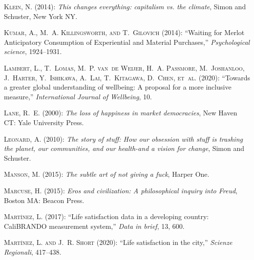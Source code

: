 \documentclass[10pt, letterpaper]{article}
\begin{document}
\begin{spacing}{2}
\begin{thebibliography}{120}
\textsc{Klein, N.} (2014): \emph{This changes everything: capitalism vs. the
  climate}, Simon and Schuster, New York NY.

\textsc{Kumar, A., M.~A. Killingsworth, and T.~Gilovich} (2014):
  \enquote{Waiting for Merlot Anticipatory Consumption of Experiential and
  Material Purchases,} \emph{Psychological science}, 1924--1931.

\textsc{Lambert, L., T.~Lomas, M.~P. van~de Weijer, H.~A. Passmore,
  M.~Joshanloo, J.~Harter, Y.~Ishikawa, A.~Lai, T.~Kitagawa, D.~Chen, et~al.}
  (2020): \enquote{Towards a greater global understanding of wellbeing: A
  proposal for a more inclusive measure,} \emph{International Journal of
  Wellbeing}, 10.

\textsc{Lane, R.~E.} (2000): \emph{The loss of happiness in market
  democracies}, New Haven CT: Yale University Press.

\textsc{Leonard, A.} (2010): \emph{The story of stuff: How our obsession with
  stuff is trashing the planet, our communities, and our health-and a vision
  for change}, Simon and Schuster.

\textsc{Manson, M.} (2015): \emph{The subtle art of not giving a fuck}, Harper
  One.

\textsc{Marcuse, H.} (2015): \emph{Eros and civilization: A philosophical
  inquiry into Freud}, Boston MA: Beacon Press.

\textsc{Mart{\'\i}nez, L.} (2017): \enquote{Life satisfaction data in a
  developing country: CaliBRANDO measurement system,} \emph{Data in brief}, 13,
  600.

\textsc{Mart{\'\i}nez, L. and J.~R. Short} (2020): \enquote{Life satisfaction
  in the city,} \emph{Scienze Regionali}, 417--438.


\end{thebibliography}
\end{spacing}
\end{document}
